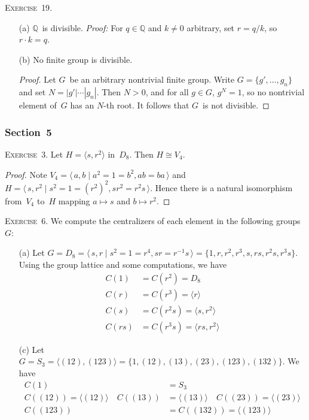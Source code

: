 \documentclass[letterpaper]{article}
\newcommand{\exercise}[1]{\goodbreak\noindent\textsc{Exercise~{#1}.}}
\newcommand{\Q}{\mathbb{Q}}
\newcommand{\iso}{\cong}
\newcommand{\ord}[1]{|{#1}|}
\newcommand{\gen}[1]{\langle{#1}\rangle}
\begin{document}
\bigskip
\exercise{19}
\begin{enumerate}[itemsep=0pt]
\item[(a)] $\Q$~is divisible. \emph{Proof:} For $q\in\Q$ and $k\ne0$ arbitrary, set $r=q/k$, so $r\cdot k = q$.
\item[(b)] No finite group is divisible.
\begin{proof}
Let $G$~be an arbitrary nontrivial finite group. Write $G=\{g',\ldots,g_n\}$ and set $N=\ord{g'}\cdots\ord{g_n}$. Then $N>0$, and for all $g\in G$, $g^N=1$, so no nontrivial element of~$G$ has an $N$-th root. It follows that $G$~is not divisible.
\end{proof}
\end{enumerate}

\subsubsection*{Section~5}
\exercise{3}
Let $H=\gen{s,r^2}$ in~$D_8$. Then $H\iso V_4$.
\begin{proof}
Note $V_4=\gen{\,a,b\mid a^2=1=b^2, ab=ba\,}$ and $H=\gen{\,s,r^2\mid s^2=1=(r^2)^2,sr^2=r^2s\,}$. Hence there is a natural isomorphism from~$V_4$ to~$H$ mapping $a\mapsto s$ and $b\mapsto r^2$.
\end{proof}

\exercise{6}
We compute the centralizers of each element in the following groups~$G$:
\begin{enumerate}[itemsep=0pt]
\item[(a)] Let $G=D_8=\gen{\,s,r\mid s^2=1=r^4,sr=r^{-1}s\,}=\{1,r,r^2,r^3,s,rs,r^2s,r^3s\}$. Using the group lattice and some computations, we have
\begin{align*}
C(1)&=C(r^2)=D_8\\
C(r)&=C(r^3)=\gen{r}\\
C(s)&=C(r^2s)=\gen{s,r^2}\\
C(rs)&=C(r^3s)=\gen{rs,r^2}
\end{align*}

\item[(c)] Let $G=S_3=\gen{(12),(123)}=\{1,(12),(13),(23),(123),(132)\}$. We have
\begin{align*}
C(1)&=S_3\\
C((12))=\gen{(12)}\quad C((13))&=\gen{(13)}\quad C((23))=\gen{(23)}\\
C((123))&=C((132))=\gen{(123)}
\end{align*}
\end{enumerate}
\end{document}

